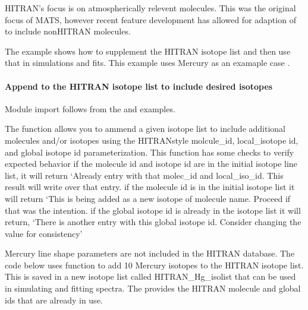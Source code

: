 \documentclass[letterpaper,10pt,english]{sphinxmanual}
\begin{document}
\sphinxAtStartPar
HITRAN’s focus is on atmospherically relevent molecules.  This was the original focus of MATS, however recent feature development has allowed for adaption of to include non\sphinxhyphen{}HITRAN molecules.

\sphinxAtStartPar
The example shows how to supplement the HITRAN isotope list and then use that in simulations and fits. This example uses Mercury as an examaple case .


\paragraph{Append to the HITRAN isotope list to include desired isotopes}
\label{\detokenize{Fitting and Simulating isotopes and molecules not in HITRAN:append-to-the-hitran-isotope-list-to-include-desired-isotopes}}
\sphinxAtStartPar
Module import follows from the {\hyperref[\detokenize{Fitting Experimental Spectra:fitting-experimental-spectra}]{}} and {\hyperref[\detokenize{Fitting Synthetic Spectra:fitting-synthetic-spectra}]{}} examples.

\sphinxAtStartPar
The {\hyperref[\detokenize{MATS:MATS.utilities.add_to_HITRANstyle_isotope_list}]{}} function allows you to ammend a given isotope list to include additional molecules and/or isotopes using the HITRAN\sphinxhyphen{}style molcule\_id, local\_isotope id, and global isotope id parameterization.  This function has some checks to verify expected behavior
\sphinxhyphen{} if the molecule id and isotope id are in the initial isotope line list, it will return ‘Already entry with that molec\_id and local\_iso\_id.  This result will write over that entry.
\sphinxhyphen{} if the molecule id is in the initial isotope list it will return ‘This is being added as a new isotope of molecule name.  Proceed if that was the intention.
\sphinxhyphen{} if the global isotope id is already in the isotope list it will return, ‘There is another entry with this global isotope id.  Consider changing the value for consistency’

\sphinxAtStartPar
Mercury line shape parameters are not included in the HITRAN database.  The code below uses {\hyperref[\detokenize{MATS:MATS.utilities.add_to_HITRANstyle_isotope_list}]{}} function to add 10 Mercury isotopes to the HITRAN isotope list.  This is saved in a new isotope list called HITRAN\_Hg\_isolist that can be used in simulating and fitting spectra. The  provides the HITRAN molecule and global ids that are already in use.
\end{document}
